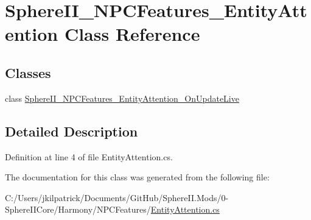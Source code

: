 \hypertarget{class_sphere_i_i___n_p_c_features___entity_attention}{}\section{Sphere\+I\+I\+\_\+\+N\+P\+C\+Features\+\_\+\+Entity\+Attention Class Reference}
\label{class_sphere_i_i___n_p_c_features___entity_attention}
\subsection*{Classes}
\begin{DoxyCompactItemize}
\item 
class \mbox{\hyperlink{class_sphere_i_i___n_p_c_features___entity_attention_1_1_sphere_i_i___n_p_c_features___entity_attention___on_update_live}{Sphere\+I\+I\+\_\+\+N\+P\+C\+Features\+\_\+\+Entity\+Attention\+\_\+\+On\+Update\+Live}}
\end{DoxyCompactItemize}


\subsection{Detailed Description}


Definition at line 4 of file Entity\+Attention.\+cs.



The documentation for this class was generated from the following file\+:\begin{DoxyCompactItemize}
\item 
C\+:/\+Users/jkilpatrick/\+Documents/\+Git\+Hub/\+Sphere\+I\+I.\+Mods/0-\/\+Sphere\+I\+I\+Core/\+Harmony/\+N\+P\+C\+Features/\mbox{\hyperlink{_entity_attention_8cs}{Entity\+Attention.\+cs}}\end{DoxyCompactItemize}
